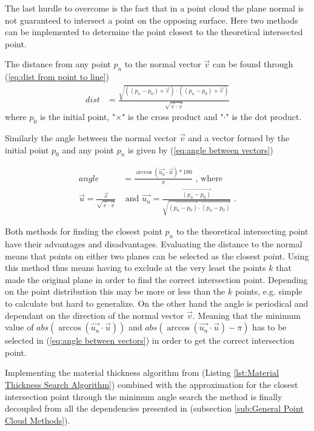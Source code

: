 \documentclass[%
]{USN-MSc}
\begin{document}
The last hurdle to overcome is the fact that in a point cloud the plane normal is not guaranteed to intersect a point on the opposing surface. Here two methods can be implemented to determine the point closest to the theoretical intersected point.

The distance from any point \(p_n\) to the normal vector \(\vec{v}\) can be found through (\ref{eq:dist from point to line})
\begin{align}
    \label{eq:dist from point to line}
    dist & = \frac{\sqrt{((p_n - p_0)\times \vec{v})\cdot ((p_n - p_0)\times \vec{v})}}{\sqrt{\vec{v}\cdot \vec{v}}}
\end{align}
where \(p_0\) is the initial point, "\(\times\)" is the cross product and "\(\cdot\)" is the dot product. 
\clearpage

Similarly the angle between the normal vector \(\vec{v}\) and a vector formed by the initial point \(p_0\) and any point \(p_n\) is given by (\ref{eq:angle between vectors})

\begin{align}
\label{eq:angle between vectors}
    angle &= \frac{\arccos{(\vec{u_n}\cdot \vec{u})}*180}{\pi} \text{ , where} \\
    \vec{u} = \frac{\vec{v}}{\sqrt{\vec{v} \cdot \vec{v}}} &\text{ and }
    \vec{u_n} = \frac{\vec{(p_n - p_0)}}{\sqrt{\vec{(p_n - p_0)} \cdot \vec{(p_n - p_0)}}} \text{ .}
\end{align}

Both methods for finding the closest point \(p_n\) to the theoretical intersecting point have their advantages and disadvantages. Evaluating the distance to the normal means that points on either two planes can be selected as the closest point. Using this method thus means having to exclude at the very least the points \(k\) that made the original plane in order to find the correct intersection point. Depending on the point distribution this may be more or less than the \(k\) points, e.g. simple to calculate but hard to generalize. On the other hand the angle is periodical and dependant on the direction of the normal vector \(\vec{v}\). Meaning that the minimum value of \(abs(\arccos{(\vec{u_n}\cdot \vec{u})})\) and \(abs(\arccos{(\vec{u_n}\cdot \vec{u})} - \pi)\) has to be selected in (\ref{eq:angle between vectors}) in order to get the correct intersection point.

Implementing the material thickness algorithm from (Listing \ref{lst:Material Thickness Search Algorithm}) combined with the approximation for the closest intersection point through the minimum angle search the method is finally decoupled from all the dependencies presented in (subsection \ref{sub:General Point Cloud Methods}).
\end{document}
